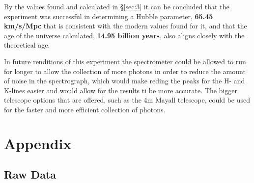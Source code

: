 \documentclass[12pt]{article}
\begin{document}
By the values found and calculated in §\ref{sec:3} it can be concluded that the experiment was successful in determining a Hubble parameter, \textbf{65.45 km/s/Mpc} that is consistent with the modern
values found for it, and that the age of the universe calculated, \textbf{14.95 billion years}, also aligns closely with the theoretical age.

In future renditions of this experiment the spectrometer could be allowed to run for longer to allow the collection of more photons in order
to reduce the amount of noise in the spectrograph, which would make reding the peaks for the H- and K-lines easier and would allow for the results ti be more accurate.
The bigger telescope options that are offered, such as the 4m Mayall telescope, could be used for the faster and more efficient collection of photons.

\newpage





\newpage

\section*{Appendix} \label{sec:A}

\listoffigures

\listoftables

\subsection*{Raw Data}
\end{document}
